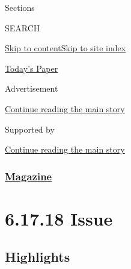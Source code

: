 Sections

SEARCH

\protect\hyperlink{site-content}{Skip to
content}\protect\hyperlink{site-index}{Skip to site index}

\href{https://myaccount.nytimes3xbfgragh.onion/auth/login?response_type=cookie\&client_id=vi}{}

\href{https://www.nytimes3xbfgragh.onion/section/todayspaper}{Today's
Paper}

Advertisement

\protect\hyperlink{after-top}{Continue reading the main story}

Supported by

\protect\hyperlink{after-sponsor}{Continue reading the main story}

\hypertarget{magazine}{%
\subsubsection{\texorpdfstring{\href{/section/magazine}{Magazine}}{Magazine}}\label{magazine}}

\hypertarget{61718-issue}{%
\section{6.17.18 Issue}\label{61718-issue}}

\hypertarget{highlights}{%
\subsection{Highlights}\label{highlights}}

